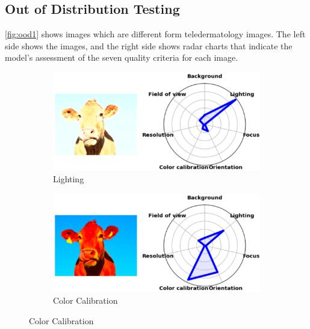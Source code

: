 \subsection{Out of Distribution Testing}
\label{BO}
\autoref{fig:ood1} shows images which are different form teledermatology images. The left side shows the images, and the right side shows radar charts that indicate the model’s assessment of the seven quality criteria for each image. \par
\vspace{\baselineskip}
\begin{figure}[ht]
    \centering
    \begin{subfigure}[b]{0.48\textwidth}
        \includegraphics[width=\textwidth]{img/ood/1l.png}
        \caption{Lighting}
        \label{fig:1l}
    \end{subfigure}
    \hfill
    \begin{subfigure}[b]{0.48\textwidth}
        \includegraphics[width=\textwidth]{img/ood/1c.png}
        \caption{Color Calibration}
        \label{fig:1c}
    \end{subfigure}


\end{figure}
